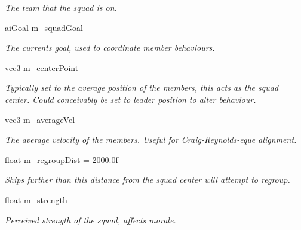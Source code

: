 \begin{DoxyCompactItemize}
\begin{DoxyCompactList}\small\item\em The team that the squad is on. \end{DoxyCompactList}\item 
\hypertarget{structsquad_a99940fccf13785ab516fdf4afc68e328}{\hyperlink{enemy_8hpp_a6e73eb3e8e86f5922e45adeb450ceb1e}{ai\-Goal} \hyperlink{structsquad_a99940fccf13785ab516fdf4afc68e328}{m\-\_\-squad\-Goal}}\label{structsquad_a99940fccf13785ab516fdf4afc68e328}

\begin{DoxyCompactList}\small\item\em The currents goal, used to coordinate member behaviours. \end{DoxyCompactList}\item 
\hypertarget{structsquad_ae5836de9f2556e38d2e9b78fda8c3abd}{\hyperlink{structvec3}{vec3} \hyperlink{structsquad_ae5836de9f2556e38d2e9b78fda8c3abd}{m\-\_\-center\-Point}}\label{structsquad_ae5836de9f2556e38d2e9b78fda8c3abd}

\begin{DoxyCompactList}\small\item\em Typically set to the average position of the members, this acts as the squad center. Could conceivably be set to leader position to alter behaviour. \end{DoxyCompactList}\item 
\hypertarget{structsquad_ab0584c31fa3c89a99dc700d830619816}{\hyperlink{structvec3}{vec3} \hyperlink{structsquad_ab0584c31fa3c89a99dc700d830619816}{m\-\_\-average\-Vel}}\label{structsquad_ab0584c31fa3c89a99dc700d830619816}

\begin{DoxyCompactList}\small\item\em The average velocity of the members. Useful for Craig-\/\-Reynolds-\/eque alignment. \end{DoxyCompactList}\item 
\hypertarget{structsquad_a53048bfba949abf5351e18982ca34d22}{float \hyperlink{structsquad_a53048bfba949abf5351e18982ca34d22}{m\-\_\-regroup\-Dist} = 2000.\-0f}\label{structsquad_a53048bfba949abf5351e18982ca34d22}

\begin{DoxyCompactList}\small\item\em Ships further than this distance from the squad center will attempt to regroup. \end{DoxyCompactList}\item 
\hypertarget{structsquad_a7e29621628f833feb8fd24525e044586}{float \hyperlink{structsquad_a7e29621628f833feb8fd24525e044586}{m\-\_\-strength}}\label{structsquad_a7e29621628f833feb8fd24525e044586}

\begin{DoxyCompactList}\small\item\em Perceived strength of the squad, affects morale. \end{DoxyCompactList}\end{DoxyCompactItemize}


